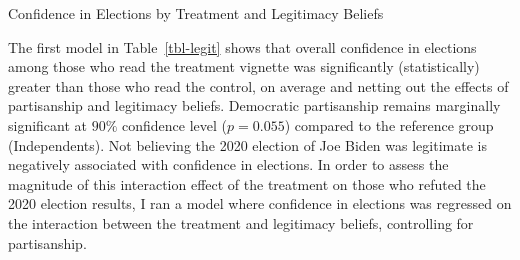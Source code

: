 \documentclass[
  12pt,
  letterpaper,
]{article}
\begin{document}
\begin{table}[t]

\caption{\label{tbl-legit}Confidence in Elections by Treatment and
Legitimacy Beliefs}


\end{table}%

The first model in Table~\ref{tbl-legit} shows that overall confidence
in elections among those who read the treatment vignette was
significantly (statistically) greater than those who read the control,
on average and netting out the effects of partisanship and legitimacy
beliefs. Democratic partisanship remains marginally significant at
\(90\%\) confidence level (\(p = 0.055\)) compared to the reference
group (Independents). Not believing the 2020 election of Joe Biden was
legitimate is negatively associated with confidence in elections. In
order to assess the magnitude of this interaction effect of the
treatment on those who refuted the 2020 election results, I ran a model
where confidence in elections was regressed on the interaction between
the treatment and legitimacy beliefs, controlling for partisanship.
\end{document}
